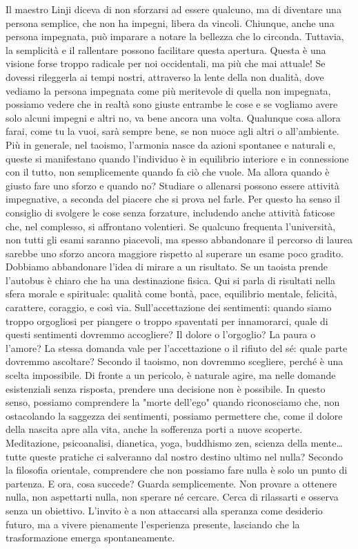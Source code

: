 \documentclass[12pt]{book} %
\begin{document}
Il maestro Linji diceva di non sforzarsi ad essere qualcuno, ma di diventare una persona semplice, che non ha impegni, libera da vincoli. Chiunque, anche una persona impegnata, può imparare a notare la bellezza che lo circonda. Tuttavia, la semplicità e il rallentare possono facilitare questa apertura. Questa è una visione forse troppo radicale per noi occidentali, ma più che mai attuale! Se dovessi rileggerla ai tempi nostri, attraverso la lente della non dualità, dove vediamo la persona impegnata come più meritevole di quella non impegnata, possiamo vedere che in realtà sono giuste entrambe le cose e se vogliamo avere solo alcuni impegni e altri no, va bene ancora una volta.
Qualunque cosa allora farai, come tu la vuoi, sarà sempre bene, se non nuoce agli altri o all'ambiente. Più in generale, nel taoismo, l’armonia nasce da azioni spontanee e naturali e, queste si manifestano quando l’individuo è in equilibrio interiore e in connessione con il tutto, non semplicemente quando fa ciò che vuole.
Ma allora quando è giusto fare uno sforzo e quando no? Studiare o allenarsi possono essere attività impegnative, a seconda del piacere che si prova nel farle. Per questo ha senso il consiglio di svolgere le cose senza forzature, includendo anche attività faticose che, nel complesso, si affrontano volentieri. Se qualcuno frequenta l'università, non tutti gli esami saranno piacevoli, ma spesso abbandonare il percorso di laurea sarebbe uno sforzo ancora maggiore rispetto al superare un esame poco gradito.
Dobbiamo abbandonare l'idea di mirare a un risultato. Se un taoista prende l'autobus è chiaro che ha una destinazione fisica. Qui si parla di risultati nella sfera morale e spirituale: qualità come bontà, pace, equilibrio mentale, felicità, carattere, coraggio, e così via.
Sull'accettazione dei sentimenti: quando siamo troppo orgogliosi per piangere o troppo spaventati per innamorarci, quale di questi sentimenti dovremmo accogliere? Il dolore o l'orgoglio? La paura o l'amore?
La stessa domanda vale per l'accettazione o il rifiuto del sé: quale parte dovremmo ascoltare? Secondo il taoismo, non dovremmo scegliere, perché è una scelta impossibile. Di fronte a un pericolo, è naturale agire, ma nelle domande esistenziali senza risposta, prendere una decisione non è possibile.
In questo senso, possiamo comprendere la "morte dell'ego" quando riconosciamo che, non ostacolando la saggezza dei sentimenti, possiamo permettere che, come il dolore della nascita apre alla vita, anche la sofferenza porti a nuove scoperte.
Meditazione, psicoanalisi, dianetica, yoga, buddhismo zen, scienza della mente… tutte queste pratiche ci salveranno dal nostro destino ultimo nel nulla? Secondo la filosofia orientale, comprendere che non possiamo fare nulla è solo un punto di partenza. E ora, cosa succede? Guarda semplicemente. Non provare a ottenere nulla, non aspettarti nulla, non sperare né cercare. Cerca di rilassarti e osserva senza un obiettivo. L’invito è a non attaccarsi alla speranza come desiderio futuro, ma a vivere pienamente l’esperienza presente, lasciando che la trasformazione emerga spontaneamente.
\end{document}
